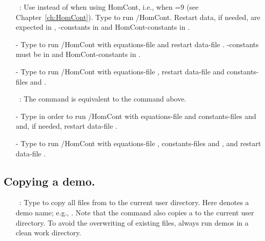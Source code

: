 \begin{itemize}
\item[\commandf{@h}]~:
  Use  instead of  when using {\cal HomCont}, i.e., when =9
  (see Chapter~\ref{ch:HomCont}).
  Type  to run \AUTO/{\cal HomCont}.
  Restart data, if needed, are expected in ,
  \AUTO-constants in  and {\cal HomCont}-constants in .
\item[-]
  Type  to run \AUTO/{\cal HomCont}
  with equations-file  and restart data-file .
  \AUTO-constants must be in  and {\cal HomCont}-constants in .
\item[-]
  Type  to run \AUTO/{\cal HomCont}
  with equations-file , restart data-file 
  and constants-files  and .

\item[\commandf{@H}]~:
  The command  is equivalent to the command  above.
\item[-]
  Type  in order to run \AUTO/{\cal HomCont} with equations-file 
  and constants-files  and 
  and, if needed, restart data-file . 
\item[-]
  Type  to run \AUTO/{\cal HomCont}
  with equations-file , 
  constants-files  and ,
  and restart data-file .
\end{itemize}

\subsection{ Copying a demo.} 

\begin{itemize}

\item[\commandf{@dm}]~:
  Type  
  to copy all files 
  from 
  to the current user directory.
  Here  denotes a demo name; e.g., .
  Note that the  command also copies a  
  to the current user directory. To avoid the overwriting of
  existing files, always run demos in a clean work directory.
\end{itemize}

